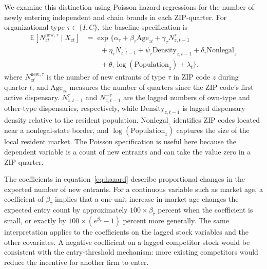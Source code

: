 \documentclass[english,12pt]{article}
\begin{document}
We examine this distinction using Poisson hazard regressions for the number of newly entering independent and chain brands in each ZIP-quarter. For organizational type $\tau\in\{I,C\}$, the baseline specification is
\begin{equation}
\label{eq:hazard}
\begin{aligned}
\mathbb{E}\!\left[
N^{\mathrm{new},\tau}_{zt}\mid X_{zt}
\right]
&=
\exp\Bigg\{
\alpha_\tau
+ \beta_\tau \mathrm{Age}_{zt}
+ \gamma_\tau N^{\tau}_{z,t-1} \\
&\qquad
+ \eta_\tau N^{-\tau}_{z,t-1}
+ \psi_\tau \mathrm{Density}_{z,t-1}
+ \delta_\tau \mathrm{Nonlegal}_z \\
&\qquad
+ \theta_\tau \log(\mathrm{Population}_z)
+ \lambda_t
\Bigg\}.
\end{aligned}
\end{equation}
where $N^{\mathrm{new},\tau}_{zt}$ is the number of new entrants of type $\tau$ in ZIP code $z$ during quarter $t$, and $\mathrm{Age}_{zt}$ measures the number of quarters since the ZIP code's first active dispensary. $N^{\tau}_{z,t-1}$ and $N^{-\tau}_{z,t-1}$ are the lagged numbers of own-type and other-type dispensaries, respectively, while $\mathrm{Density}_{z,t-1}$ is lagged dispensary density relative to the resident population. $\mathrm{Nonlegal}_z$ identifies ZIP codes located near a nonlegal-state border, and $\log(\mathrm{Population}_z)$ captures the size of the local resident market. The Poisson specification is useful here because the dependent variable is a count of new entrants and can take the value zero in a ZIP-quarter.

The coefficients in equation~\eqref{eq:hazard} describe proportional changes in the expected number of new entrants. For a continuous variable such as market age, a coefficient of $\beta_\tau$ implies that a one-unit increase in market age changes the expected entry count by approximately $100\times\beta_\tau$ percent when the coefficient is small, or exactly by $100\times(e^{\beta_\tau}-1)$ percent more generally. The same interpretation applies to the coefficients on the lagged stock variables and the other covariates. A negative coefficient on a lagged competitor stock would be consistent with the entry-threshold mechanism: more existing competitors would reduce the incentive for another firm to enter. 
\end{document}
